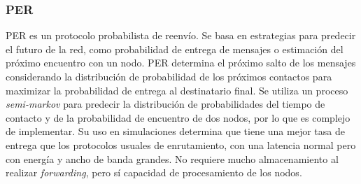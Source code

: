 \subsubsection{PER}
PER\cite{per} es un protocolo probabilista de reenvío. Se basa en estrategias para predecir el futuro de la red, como probabilidad de entrega de mensajes o estimación del próximo encuentro con un nodo. PER determina el próximo salto de los mensajes considerando la distribución de probabilidad de los próximos contactos para maximizar la probabilidad de entrega al destinatario final. Se utiliza un proceso \emph{semi-markov} para predecir la distribución de probabilidades del tiempo de contacto y de la probabilidad de encuentro de dos nodos, por lo que es complejo de implementar.
Su uso en simulaciones determina que tiene una mejor tasa de entrega que los protocolos usuales de enrutamiento, con una latencia normal pero con energía y ancho de banda grandes. No requiere mucho almacenamiento al realizar \emph{forwarding}, pero sí capacidad de procesamiento de los nodos.